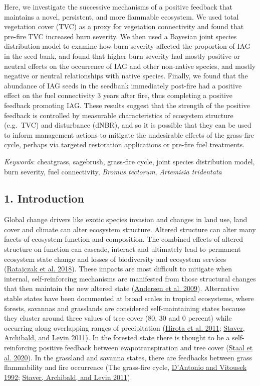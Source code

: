 \documentclass[
  12pt,
]{article}
\begin{document}
Here, we investigate the successive mechanisms of a positive feedback
that maintains a novel, persistent, and more flammable ecosystem. We
used total vegetation cover (TVC) as a proxy for vegetation connectivity
and found that pre-fire TVC increased burn severity. We then used a
Bayesian joint species distribution model to examine how burn severity
affected the proportion of IAG in the seed bank, and found that higher
burn severity had mostly positive or neutral effects on the occurrence
of IAG and other non-native species, and mostly negative or neutral
relationships with native species. Finally, we found that the abundance
of IAG seeds in the seedbank immediately post-fire had a positive effect
on the fuel connectivity 3 years after fire, thus completing a positive
feedback promoting IAG. These results suggest that the strength of the
positive feedback is controlled by measurable characteristics of
ecosystem structure (e.g.~TVC) and disturbance (dNBR), and so it is
possible that they can be used to inform management actions to mitigate
the undesirable effects of the grass-fire cycle, perhaps via targeted
restoration applications or pre-fire fuel treatments.

\emph{Keywords}: cheatgrass, sagebrush, grass-fire cycle, joint species
distribution model, burn severity, fuel connectivity, \emph{Bromus
tectorum}, \emph{Artemisia tridentata}

\hypertarget{introduction}{%
\subsection{1. Introduction}\label{introduction}}

Global change drivers like exotic species invasion and changes in land
use, land cover and climate can alter ecosystem structure. Altered
structure can alter many facets of ecosystem function and composition.
The combined effects of altered structure on function can cascade,
interact and ultimately lead to permanent ecosystem state change and
losses of biodiversity and ecosystem services
(\protect\hyperlink{ref-Ratajczak2018}{Ratajczak et al. 2018}). These
impacts are most difficult to mitigate when internal, self-reinforcing
mechanisms are manifested from those structural changes that then
maintain the new altered state
(\protect\hyperlink{ref-Andersen2009}{Andersen et al. 2009}).
Alternative stable states have been documented at broad scales in
tropical ecosystems, where forests, savannas and grasslands are
considered self-maintaining states because they cluster around three
values of tree cover (80, 30 and 0 percent) while occurring along
overlapping ranges of precipitation
(\protect\hyperlink{ref-Hirota2011}{Hirota et al. 2011};
\protect\hyperlink{ref-Staver2011}{Staver, Archibald, and Levin 2011}).
In the forested state there is thought to be a self-reinforcing positive
feedback between evapotranspiration and tree cover
(\protect\hyperlink{ref-Staal2020}{Staal et al. 2020}). In the grassland
and savanna states, there are feedbacks between grass flammability and
fire occurrence (The grass-fire cycle,
\protect\hyperlink{ref-DAntonio1992}{D'Antonio and Vitousek 1992};
\protect\hyperlink{ref-Staver2011}{Staver, Archibald, and Levin 2011}).
\end{document}
